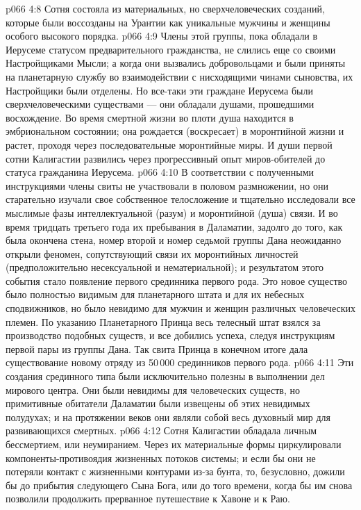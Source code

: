 \vs p066 4:8 \bibnobreakspace Сотня состояла из материальных, но сверхчеловеческих созданий, которые были воссозданы на Урантии как уникальные мужчины и женщины особого высокого порядка.
\vs p066 4:9 Члены этой группы, пока обладали в Иерусеме статусом предварительного гражданства, не слились еще со своими Настройщиками Мысли; а когда они вызвались добровольцами и были приняты на планетарную службу во взаимодействии с нисходящими чинами сыновства, их Настройщики были отделены. Но все\hyp{}таки эти граждане Иерусема были сверхчеловеческими существами --- они обладали душами, прошедшими восхождение. Во время смертной жизни во плоти душа находится в эмбриональном состоянии; она рождается (воскресает) в моронтийной жизни и растет, проходя через последовательные моронтийные миры. И души первой сотни Калигастии развились через прогрессивный опыт миров\hyp{}обителей до статуса гражданина Иерусема.
\vs p066 4:10 В соответствии с полученными инструкциями члены свиты не участвовали в половом размножении, но они старательно изучали свое собственное телосложение и тщательно исследовали все мыслимые фазы интеллектуальной (разум) и моронтийной (душа) связи. И во время тридцать третьего года их пребывания в Даламатии, задолго до того, как была окончена стена, номер второй и номер седьмой группы Дана неожиданно открыли феномен, сопутствующий связи их моронтийных личностей (предположительно несексуальной и нематериальной); и результатом этого события стало появление первого срединника первого рода. Это новое существо было полностью видимым для планетарного штата и для их небесных сподвижников, но было невидимо для мужчин и женщин различных человеческих племен. По указанию Планетарного Принца весь телесный штат взялся за производство подобных существ, и все добились успеха, следуя инструкциям первой пары из группы Дана. Так свита Принца в конечном итоге дала существование новому отряду из 50\,000 срединников первого рода.
\vs p066 4:11 Эти создания срединного типа были исключительно полезны в выполнении дел мирового центра. Они были невидимы для человеческих существ, но примитивные обитатели Даламатии были извещены об этих невидимых полудухах; и на протяжении веков они являли собой весь духовный мир для развивающихся смертных.
\vs p066 4:12 \bibnobreakspace Сотня Калигастии обладала личным бессмертием, или неумиранием. Через их материальные формы циркулировали компоненты\hyp{}противоядия жизненных потоков системы; и если бы они не потеряли контакт с жизненными контурами из\hyp{}за бунта, то, безусловно, дожили бы до прибытия следующего Сына Бога, или до того времени, когда бы им снова позволили продолжить прерванное путешествие к Хавоне и к Раю.
